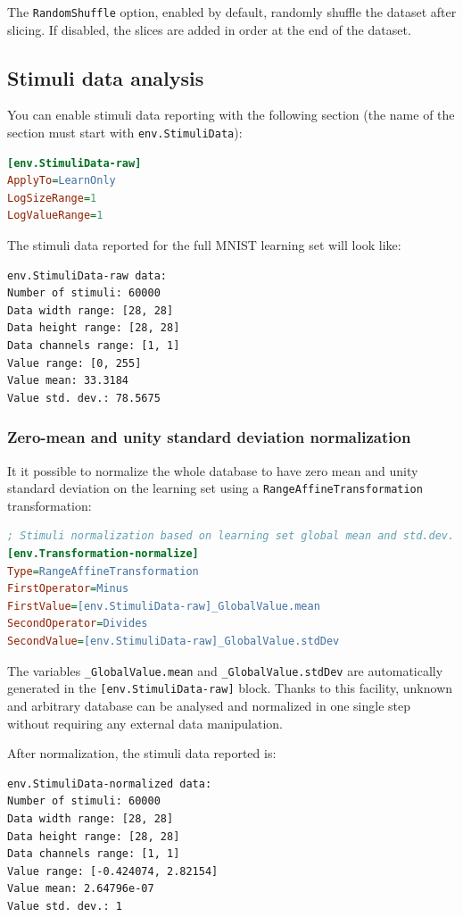 \documentclass[a4paper,11pt,oneside]{article}
\begin{document}
The \lstinline!RandomShuffle! option, enabled by default, randomly shuffle the dataset after slicing. If disabled, the slices are added in order at the end of the dataset.

\subsection{Stimuli data analysis}

You can enable stimuli data reporting with the following section (the name of
the section must start with \lstinline!env.StimuliData!):
\begin{lstlisting}[language=ini]
[env.StimuliData-raw]
ApplyTo=LearnOnly
LogSizeRange=1
LogValueRange=1
\end{lstlisting}

The stimuli data reported for the full MNIST learning set will look like:
\begin{lstlisting}[style=console]
env.StimuliData-raw data:
Number of stimuli: 60000
Data width range: [28, 28]
Data height range: [28, 28]
Data channels range: [1, 1]
Value range: [0, 255]
Value mean: 33.3184
Value std. dev.: 78.5675
\end{lstlisting}

\subsubsection{Zero-mean and unity standard deviation normalization}

It it possible to normalize the whole database to have zero mean and unity
standard deviation on the learning set using a
\lstinline!RangeAffineTransformation! transformation:
\begin{lstlisting}[language=ini]
; Stimuli normalization based on learning set global mean and std.dev.
[env.Transformation-normalize]
Type=RangeAffineTransformation
FirstOperator=Minus
FirstValue=[env.StimuliData-raw]_GlobalValue.mean
SecondOperator=Divides
SecondValue=[env.StimuliData-raw]_GlobalValue.stdDev
\end{lstlisting}
The variables \lstinline!_GlobalValue.mean! and \lstinline!_GlobalValue.stdDev!
are automatically generated in the \lstinline![env.StimuliData-raw]! block.
Thanks to this facility, unknown and arbitrary database can be analysed and
normalized in one single step without requiring any external data manipulation.

After normalization, the stimuli data reported is:
\begin{lstlisting}[style=console]
env.StimuliData-normalized data:
Number of stimuli: 60000
Data width range: [28, 28]
Data height range: [28, 28]
Data channels range: [1, 1]
Value range: [-0.424074, 2.82154]
Value mean: 2.64796e-07
Value std. dev.: 1
\end{lstlisting}
\end{document}

